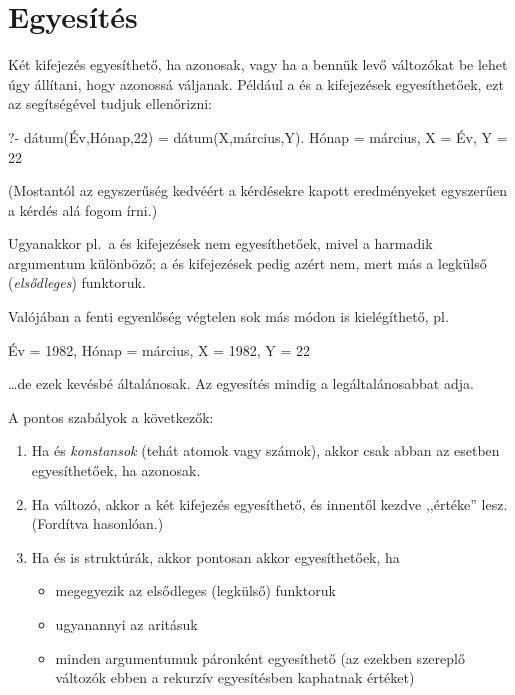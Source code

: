 \section{Egyesítés}
Két kifejezés egyesíthető, ha azonosak, vagy ha a
bennük levő változókat be lehet úgy állítani, hogy
azonossá váljanak. Például a 
és a  kifejezések
egyesíthetőek, ezt az \pr{=} segítségével tudjuk
ellenőrizni:\index{\pr{=}}
\begin{query}
?- dátum(Év,Hónap,22) = dátum(X,március,Y).
Hónap = március,
X = Év,
Y = 22
\end{query}
(Mostantól az egyszerűség kedvéért a kérdésekre
kapott eredményeket egyszerűen a kérdés alá fogom
írni.)

Ugyanakkor pl.~a  és
 kifejezések nem egyesíthetőek,
mivel a harmadik argumentum különböző; a
 és  kifejezések
pedig azért nem, mert más a legkülső
(\emph{elsődleges}) funktoruk.

Valójában a fenti egyenlőség végtelen sok más módon
is kielégíthető, pl.
\begin{query}
Év = 1982,
Hónap = március,
X = 1982,
Y = 22
\end{query}
\dots de ezek kevésbé általánosak. Az egyesítés
mindig a legáltalánosabbat adja.

A pontos szabályok a következők:
\begin{enumerate}
\item Ha  és  \emph{konstansok} (tehát
  atomok vagy számok), akkor csak abban az esetben
  egyesíthetőek, ha azonosak.
\item Ha  változó, akkor a két kifejezés
  egyesíthető, és innentől kezdve  ,,értéke''
   lesz. (Fordítva hasonlóan.)
\item Ha  és  is struktúrák, akkor pontosan akkor egyesíthetőek, ha
  \begin{itemize}
  \item megegyezik az elsődleges (legkülső) funktoruk
  \item ugyanannyi az aritásuk
  \item minden argumentumuk páronként egyesíthető
    (az ezekben szereplő változók ebben a rekurzív
    egyesítésben kaphatnak értéket)
  \end{itemize}
\end{enumerate}

